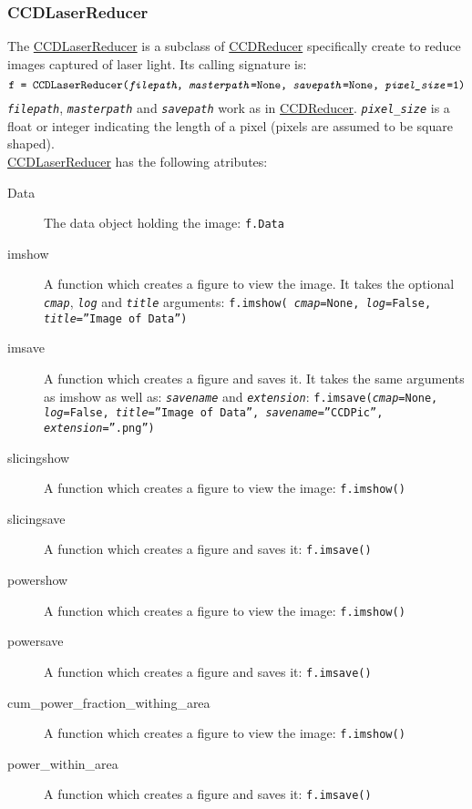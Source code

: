 \documentclass[11pt]{article}
\begin{document}
\subsubsection{CCDLaserReducer}
The \ul{CCDLaserReducer} is a subclass of \ul{CCDReducer} specifically create to reduce images captured of laser light. Its calling signature is:
\[\texttt{f = CCDLaserReducer(\textit{filepath}, \textit{masterpath}=None, \textit{savepath}=None, \textit{pixel\_size}=1)}\]
\texttt{\textit{filepath}}, \texttt{\textit{masterpath}} and \texttt{\textit{savepath}} work as in \ul{CCDReducer}. \texttt{\textit{pixel\_size}} is a float or integer indicating the length of a pixel (pixels are assumed to be square shaped).\\
\ul{CCDLaserReducer} has the following atributes:
\begin{description}
\item [Data] The data object holding the image: \texttt{f.Data}
\item [imshow] A function which creates a figure to view the image. It takes the optional \texttt{\textit{cmap}},  \texttt{\textit{log}} and \texttt{\textit{title}} arguments: \texttt{f.imshow( \textit{cmap}=None, \textit{log}=False, \textit{title}=''Image of Data'')}
\item [imsave] A function which creates a figure and saves it. It takes the same arguments as imshow as well as: \texttt{\textit{savename}} and \texttt{\textit{extension}}: \texttt{f.imsave(\textit{cmap}=None, \textit{log}=False, \textit{title}=''Image of Data'', \textit{savename}=''CCDPic'', \textit{extension}=''.png'')}
\item [slicingshow] A function which creates a figure to view the image: \texttt{f.imshow()}
\item [slicingsave] A function which creates a figure and saves it: \texttt{f.imsave()}
\item [powershow] A function which creates a figure to view the image: \texttt{f.imshow()}
\item [powersave] A function which creates a figure and saves it: \texttt{f.imsave()}
\item [cum\_power\_fraction\_withing\_area] A function which creates a figure to view the image: \texttt{f.imshow()}
\item [power\_within\_area] A function which creates a figure and saves it: \texttt{f.imsave()}
\end{description}











\end{document}
